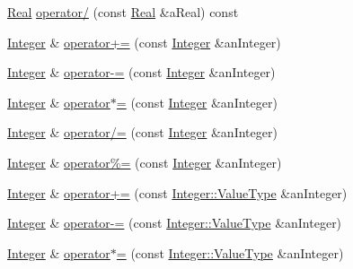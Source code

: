 \begin{DoxyCompactItemize}
\item 
\hyperlink{classostk_1_1core_1_1types_1_1_real}{Real} \hyperlink{classostk_1_1core_1_1types_1_1_integer_aa59788cd255ad5ffd307853a5737460c}{operator/} (const \hyperlink{classostk_1_1core_1_1types_1_1_real}{Real} \&a\+Real) const
\item 
\hyperlink{classostk_1_1core_1_1types_1_1_integer}{Integer} \& \hyperlink{classostk_1_1core_1_1types_1_1_integer_ab7273499b733f7cefcf29585bfabdc66}{operator+=} (const \hyperlink{classostk_1_1core_1_1types_1_1_integer}{Integer} \&an\+Integer)
\item 
\hyperlink{classostk_1_1core_1_1types_1_1_integer}{Integer} \& \hyperlink{classostk_1_1core_1_1types_1_1_integer_a426a15224a9e71c6fe9eec1f50b5e24b}{operator-\/=} (const \hyperlink{classostk_1_1core_1_1types_1_1_integer}{Integer} \&an\+Integer)
\item 
\hyperlink{classostk_1_1core_1_1types_1_1_integer}{Integer} \& \hyperlink{classostk_1_1core_1_1types_1_1_integer_ab7c52d7b0a29066e40259a3308ba61b8}{operator$\ast$=} (const \hyperlink{classostk_1_1core_1_1types_1_1_integer}{Integer} \&an\+Integer)
\item 
\hyperlink{classostk_1_1core_1_1types_1_1_integer}{Integer} \& \hyperlink{classostk_1_1core_1_1types_1_1_integer_a6a0a3e38b142c9bdac776bc5e04c48b7}{operator/=} (const \hyperlink{classostk_1_1core_1_1types_1_1_integer}{Integer} \&an\+Integer)
\item 
\hyperlink{classostk_1_1core_1_1types_1_1_integer}{Integer} \& \hyperlink{classostk_1_1core_1_1types_1_1_integer_a325f55cb34aa72922981ecfc66cc672d}{operator\%=} (const \hyperlink{classostk_1_1core_1_1types_1_1_integer}{Integer} \&an\+Integer)
\item 
\hyperlink{classostk_1_1core_1_1types_1_1_integer}{Integer} \& \hyperlink{classostk_1_1core_1_1types_1_1_integer_acc31d5d1c603bf1f597cc98acec948d2}{operator+=} (const \hyperlink{classostk_1_1core_1_1types_1_1_integer_a76a5f41f78659f116eafaf26cecc3244}{Integer\+::\+Value\+Type} \&an\+Integer)
\item 
\hyperlink{classostk_1_1core_1_1types_1_1_integer}{Integer} \& \hyperlink{classostk_1_1core_1_1types_1_1_integer_ad171591251212744f630e1561ce3ad9c}{operator-\/=} (const \hyperlink{classostk_1_1core_1_1types_1_1_integer_a76a5f41f78659f116eafaf26cecc3244}{Integer\+::\+Value\+Type} \&an\+Integer)
\item 
\hyperlink{classostk_1_1core_1_1types_1_1_integer}{Integer} \& \hyperlink{classostk_1_1core_1_1types_1_1_integer_a1ce2be07da84884672e8bbf89b183670}{operator$\ast$=} (const \hyperlink{classostk_1_1core_1_1types_1_1_integer_a76a5f41f78659f116eafaf26cecc3244}{Integer\+::\+Value\+Type} \&an\+Integer)

\end{DoxyCompactItemize}
